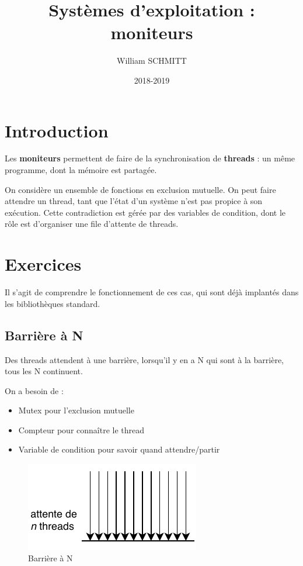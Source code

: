 \documentclass[11pt]{article}
\title{Systèmes d'exploitation : moniteurs}
\author{William SCHMITT}
\date{2018-2019}
\begin{document}
\maketitle

\section{Introduction}
Les \textbf{moniteurs} permettent de faire de la synchronisation de \textbf{threads} : un même programme, dont la mémoire est partagée.

On considère un ensemble de fonctions en exclusion mutuelle. On peut faire attendre un thread, tant que l'état d'un système n'est pas propice à son exécution. Cette contradiction est gérée par des variables de condition, dont le rôle est d'organiser une file d'attente de threads.

\section{Exercices}
Il s'agit de comprendre le fonctionnement de ces cas, qui sont déjà implantés dans les bibliothèques standard.

\subsection{Barrière à N}
Des threads attendent à une barrière, lorsqu'il y en a N qui sont à la barrière, tous les N continuent.

On a besoin de : 
\begin{itemize}
    \item Mutex pour l'exclusion mutuelle
    \item Compteur pour connaître le thread
    \item Variable de condition pour savoir quand attendre/partir
\end{itemize}

\begin{figure}[ht]
    \centering
    \includegraphics{img/cours5/barriere.pdf}
    \caption{Barrière à N}
\end{figure}
\end{document}
